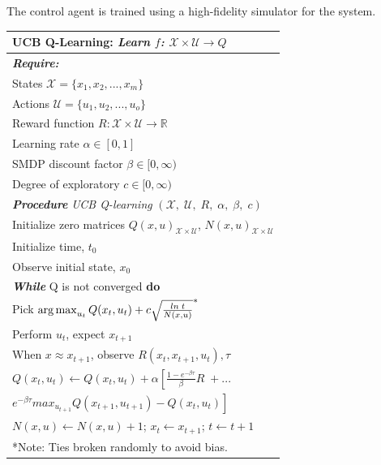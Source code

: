 The control agent is trained using a high-fidelity simulator for the system.
\begin{table}[H]
    \begin{center}
	\def\arraystretch{1.05}
	\begin{tabular}{p{12cm}}
	\hline
	\textbf{UCB Q-Learning:} \emph{Learn $f$: $\mathcal{X} \times \mathcal{U} \rightarrow Q$} \\ \hline
	
		\textbf{\textit{Require:}} \\
	    States ${\mathcal{X}} = \{x_1, x_2, ..., x_m\}$ \\
	    Actions ${\mathcal{U}} = \{u_1, u_2, ..., u_o\}$ \\
	    Reward function $R: {\mathcal{X}} \times {\mathcal{U}} \rightarrow {\mathbb{R}}$ \\
	    Learning rate $\alpha \in [0, 1]$ \\
	    SMDP discount factor $\beta \in [0, \infty)$ \\
	    Degree of exploratory $c \in [0, \infty)$ \\
		\textbf{\textit{Procedure}} \textit{UCB Q-learning} $({\mathcal{X},\; \mathcal{U}},\; R, \; \alpha, \; \beta, \; c)$ \\
		\hspace{0.25cm} Initialize zero matrices $Q(x, u)_{{\mathcal{X}} \times
		{\mathcal{U}}}$, $N(x, u)_{{\mathcal{X}} \times {\mathcal{U}}}$ \\
		\hspace{0.25cm} Initialize time, $t_0$ \\
		\hspace{0.25cm} Observe initial state, $x_0$ \\
		\hspace{0.25cm} \textbf{\textit{While}} Q is not converged \textbf{do} \\
		\hspace{0.5cm} Pick $\operatorname*{arg\,max}_{u_t} Q(x_t,u_t) + c \sqrt{\frac{ln \; t}{N(x, u)}} ^*$ \\
		\hspace{0.5cm} Perform $u_t$, expect $x_{t+1}$ \\
		\hspace{0.5cm} When $x \approx x_{t+1}$, observe $R(x_t, x_{t+1}, u_t), \tau$ \\
        \hspace{0.5cm} $Q(x_t, u_t) \leftarrow Q(x_t, u_t) + \alpha \left[\frac{1 - e^{-\beta \tau}}{\beta}R \; + ... \right.$ \\
        \hspace{1.7cm} $\left. e^{-\beta \tau} max_{u_{t+1}} Q(x_{t+1}, u_{t+1}) - Q(x_t, u_t) \right]$ \\
		\hspace{0.5cm} $N(x, u) \leftarrow N(x, u) + 1$; \; $x_t \leftarrow x_{t+1}$; \; $t \leftarrow t + 1$ \\ \hline
		*Note: Ties broken randomly to avoid bias.
	\end{tabular}
	\end{center}
\end{table}
